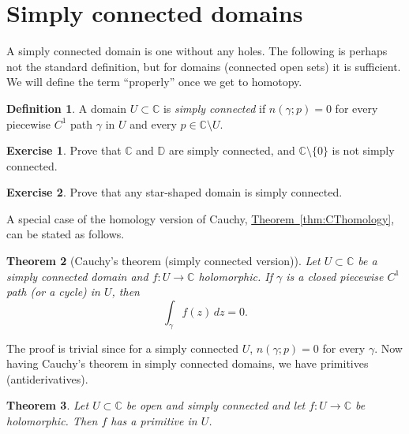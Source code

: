 \documentclass[12pt,openany]{book}
\newcommand{\C}{{\mathbb{C}}}
\newcommand{\D}{{\mathbb{D}}}
\newcommand{\myindex}[1]{#1\index{#1}}
\theoremstyle{plain}
\newtheorem{thm}{Theorem}[section]
\theoremstyle{remark}
\theoremstyle{definition}
\newtheorem{defn}[thm]{Definition}
\newenvironment{exbox}{%
    \def\FrameCommand{\vrule width 1pt \relax\hspace{10pt}}%
    \MakeFramed{\advance\hsize-\width\FrameRestore}%
}{%
    \endMakeFramed
}
\theoremstyle{exercise}
\newtheorem{exercise}{Exercise}[section]
\theoremstyle{example}
\newcommand{\thmref}[1]{\hyperref[#1]{Theorem~\ref*{#1}}}
\begin{document}

\section{Simply connected domains}

A simply connected domain is one without any holes.  The following is
perhaps not the standard definition, but for domains (connected open sets)
it is sufficient.  We will define the term ``properly'' once we get 
to homotopy.

\begin{defn} \label{defn:simplyconnected:homology}
A domain $U \subset \C$ is \emph{\myindex{simply connected}}
if $n(\gamma;p) = 0$ for every
piecewise $C^1$ path $\gamma$ in $U$ and every $p \in \C \setminus U$.
\end{defn}

\begin{exbox}
\begin{exercise}
Prove that $\C$ and $\D$ are simply connected, and $\C \setminus \{ 0 \}$
is not simply connected.
\end{exercise}

\begin{exercise}
Prove that any star-shaped domain is simply connected.
\end{exercise}
\end{exbox}

A special case of the homology version of Cauchy,
\thmref{thm:CThomology}, can be stated as follows.

\begin{thm}[Cauchy's theorem (simply connected version)]
%
Let $U \subset \C$ be a simply connected domain and $f \colon U \to \C$
holomorphic.  If $\gamma$ is a
closed
piecewise $C^1$ path (or a cycle) in $U$, then
\begin{equation*}
\int_\gamma f(z) \, dz = 0 .
\end{equation*}
\end{thm}

The proof is trivial since for a simply connected $U$, $n(\gamma;p) = 0$
for every $\gamma$.  Now having Cauchy's theorem in simply connected
domains, we have primitives (antiderivatives).

\begin{thm}
Let $U \subset \C$ be open and simply connected and
let $f \colon U \to \C$ be holomorphic.  Then $f$ has a
primitive in $U$.
\end{thm}
\end{document}
